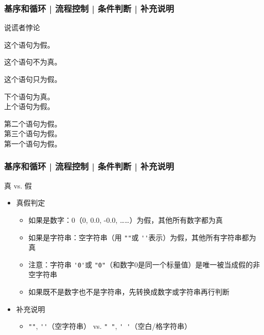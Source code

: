 \begin{frame}[fragile]
  \frametitle{基序和循环 | 流程控制 | 条件判断 | 补充说明}
  \begin{block}{说谎者悖论}
    \begin{block}{}
      这个语句为假。
    \end{block}
    \begin{block}{}
      这个语句不为真。
    \end{block}
    \begin{block}{}
      这个语句只为假。
    \end{block}
    \begin{block}{}
    下个语句为真。\\
    上个语句为假。
    \end{block}
    \begin{block}{}
    第二个语句为假。\\
    第三个语句为假。\\
    第一个语句为假。
    \end{block}
  \end{block}
\end{frame}

\begin{frame}[fragile]
  \frametitle{基序和循环 | 流程控制 | 条件判断 | \alert{补充说明}}
  \begin{block}{真 vs. 假}
    \begin{itemize}
      \item 真假判定
       	\begin{itemize}
	        \item 如果是数字：0（0, 0.0, -0.0, ……）为假，其他所有数字都为真
	        \item 如果是字符串：空字符串（用 \verb|""|或 \verb|''|表示）为假，其他所有字符串都为真
          \item 注意：字符串 \verb|'0'|或 \verb|"0"|（和数字0是同一个标量值）是唯一被当成假的非空字符串
	        \item 如果既不是数字也不是字符串，先转换成数字或字符串再行判断
        \end{itemize}
      \item 补充说明
       	\begin{itemize}
          \item \verb|""|, \verb|''|（空字符串） vs. \verb|" "|, \verb|' '|（空白/格字符串）
        \end{itemize}
    \end{itemize}
  \end{block}
\end{frame}

